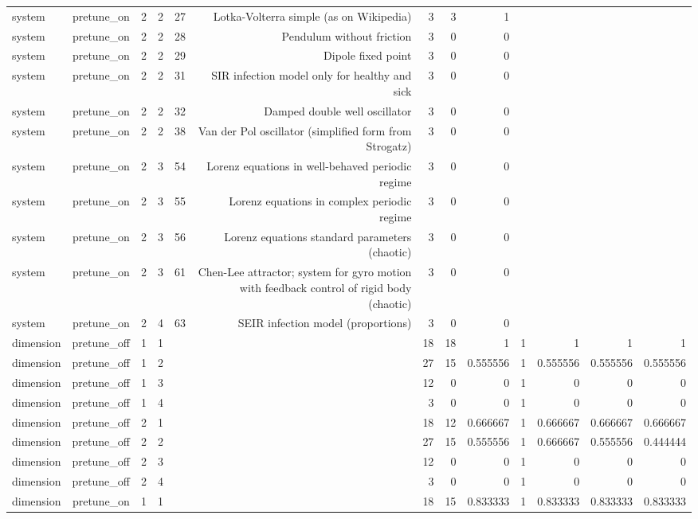 \begin{table}[htbp]
\begin{tabular}{lrrrrrrrrrrrr}
system & pretune\_on & 2 & 2 & 27 & Lotka-Volterra simple (as on Wikipedia) & 3 & 3 & 1 &  &  &  &  \\
system & pretune\_on & 2 & 2 & 28 & Pendulum without friction & 3 & 0 & 0 &  &  &  &  \\
system & pretune\_on & 2 & 2 & 29 & Dipole fixed point & 3 & 0 & 0 &  &  &  &  \\
system & pretune\_on & 2 & 2 & 31 & SIR infection model only for healthy and sick & 3 & 0 & 0 &  &  &  &  \\
system & pretune\_on & 2 & 2 & 32 & Damped double well oscillator & 3 & 0 & 0 &  &  &  &  \\
system & pretune\_on & 2 & 2 & 38 & Van der Pol oscillator (simplified form from Strogatz) & 3 & 0 & 0 &  &  &  &  \\
system & pretune\_on & 2 & 3 & 54 & Lorenz equations in well-behaved periodic regime & 3 & 0 & 0 &  &  &  &  \\
system & pretune\_on & 2 & 3 & 55 & Lorenz equations in complex periodic regime & 3 & 0 & 0 &  &  &  &  \\
system & pretune\_on & 2 & 3 & 56 & Lorenz equations standard parameters (chaotic) & 3 & 0 & 0 &  &  &  &  \\
system & pretune\_on & 2 & 3 & 61 & Chen-Lee attractor; system for gyro motion with feedback control of rigid body (chaotic) & 3 & 0 & 0 &  &  &  &  \\
system & pretune\_on & 2 & 4 & 63 & SEIR infection model (proportions) & 3 & 0 & 0 &  &  &  &  \\
dimension & pretune\_off & 1 & 1 &  &  & 18 & 18 & 1 & 1 & 1 & 1 & 1 \\
dimension & pretune\_off & 1 & 2 &  &  & 27 & 15 & 0.555556 & 1 & 0.555556 & 0.555556 & 0.555556 \\
dimension & pretune\_off & 1 & 3 &  &  & 12 & 0 & 0 & 1 & 0 & 0 & 0 \\
dimension & pretune\_off & 1 & 4 &  &  & 3 & 0 & 0 & 1 & 0 & 0 & 0 \\
dimension & pretune\_off & 2 & 1 &  &  & 18 & 12 & 0.666667 & 1 & 0.666667 & 0.666667 & 0.666667 \\
dimension & pretune\_off & 2 & 2 &  &  & 27 & 15 & 0.555556 & 1 & 0.666667 & 0.555556 & 0.444444 \\
dimension & pretune\_off & 2 & 3 &  &  & 12 & 0 & 0 & 1 & 0 & 0 & 0 \\
dimension & pretune\_off & 2 & 4 &  &  & 3 & 0 & 0 & 1 & 0 & 0 & 0 \\
dimension & pretune\_on & 1 & 1 &  &  & 18 & 15 & 0.833333 & 1 & 0.833333 & 0.833333 & 0.833333 \\

\end{tabular}
\end{table}
